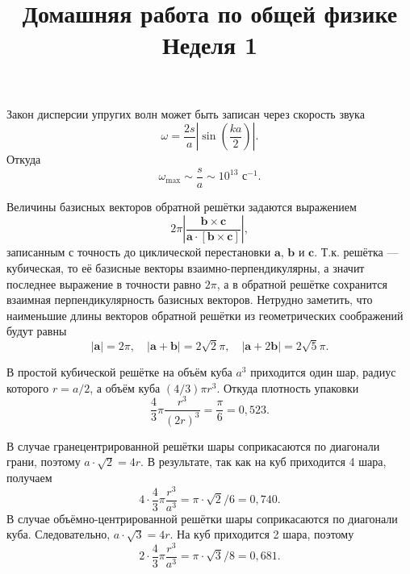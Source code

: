 \documentclass[a4paper]{article}
\title{Домашняя работа по общей физике\\
Неделя 1}
\begin{document}
	\maketitle
\begin{hiProb}[0-1-1]
\end{hiProb}
\begin{sol}
Закон дисперсии упругих волн может быть записан через скорость
звука
\[
	\omega=\frac{2s}{a}\left| \sin \left( \frac{ka}{2} \right)  \right|
.\] 
Откуда
\[
	\omega_\text{max} \sim \frac{s}{a}\sim 10^{13}\text{ с}^{-1}
.\] 
\end{sol}
\begin{hiProb}[0-1-2]
\end{hiProb}
\begin{sol}
Величины базисных векторов обратной решётки задаются выражением
 \[
	 2\pi\left| \frac{\mathbf{b}\times \mathbf{c}}{\mathbf{a}\cdot\left[ \mathbf{b}\times \mathbf{c} \right] } \right| 
 ,\] 
записанным с точность до циклической перестановки
$\mathbf{a}$, $\mathbf{b}$ и $\mathbf{c}$. Т.\:к. решётка
--- кубическая, то её базисные векторы взаимно-перпендикулярны, а значит последнее выражение в точности равно $2\pi$,
а в обратной решётке сохранится взаимная перпендикулярность
базисных векторов. Нетрудно заметить, что наименьшие длины
векторов обратной решётки из геометрических соображений
будут равны
 \[
	 |\mathbf{a}|=2\pi,\quad
	 |\mathbf{a}+\mathbf{b}|=2\sqrt{2} \pi,\quad
	 |\mathbf{a}+2\mathbf{b}|=2\sqrt{5} \pi
.\] 
\end{sol}
\begin{hiProb}[2.1]
\end{hiProb}
\begin{sol}
В простой кубической решётке на объём куба $a^3$ 
приходится один шар, радиус которого $r=a /2$, а 
объём куба $(4 /3) \pi r^3$. Откуда плотность упаковки
\[
	\frac{4}{3} \pi \frac{r^3}{(2r)^3}=\frac{\pi}{6}=
	0,523
.\] 

В случае гранецентрированной решётки шары соприкасаются
по диагонали грани, поэтому $a \cdot \sqrt{2} =4r$.
В результате, так как на куб приходится 4 шара, получаем
\[
4\cdot \frac{4}{3}\pi \frac{r^3}{a^3}=\pi \cdot
\sqrt{2} /6=0,740
.\] 
В случае объёмно-центрированной решётки шары соприкасаются
по диагонали куба. Следовательно, $a\cdot \sqrt{3} =
4r$. На куб приходится 2 шара, поэтому
\[
2\cdot \frac{4}{3} \pi \frac{r^3}{a^3}=\pi \cdot
\sqrt{3} /8=0,681
.\] 
\end{sol}
\end{document}
